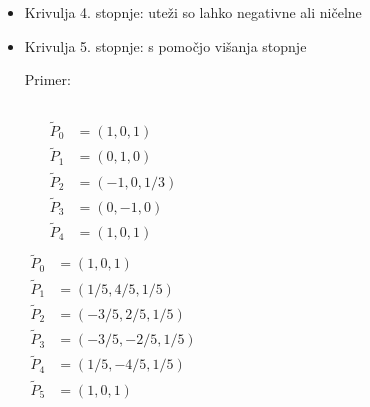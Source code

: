 \documentclass[t]{beamer}
\begin{document}
\begin{frame}
\begin{itemize}
\item Krivulja 4. stopnje: uteži so lahko negativne ali ničelne
\item Krivulja 5. stopnje: s pomočjo višanja stopnje

Primer:
\begin{columns}
	\begin{align*}
	\tilde{P}_0 &= (1,0, 1)\\
	\tilde{P}_1 &= (0, 1, 0)\\
	\tilde{P}_2 &= (-1, 0, 1/3)\\
	\tilde{P}_3 &= (0, -1, 0)\\
	\tilde{P}_4 &= (1, 0, 1) \\
	\end{align*}
    \begin{align*}
	\tilde{P}_0 &= (1,0, 1)\\
	\tilde{P}_1 &= (1/5, 4/5, 1/5)\\
	\tilde{P}_2 &= (-3/5, 2/5, 1/5)\\
	\tilde{P}_3 &= (-3/5, -2/5, 1/5)\\
	\tilde{P}_4 &= (1/5, -4/5, 1/5)\\
	\tilde{P}_5 &= (1, 0, 1) \\
	\end{align*}
\end{columns}

\end{itemize}
\end{frame}
\end{document}
